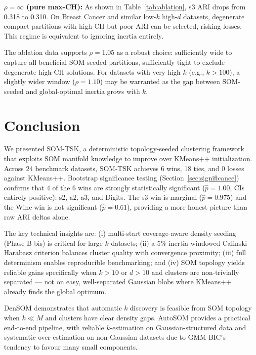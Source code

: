\documentclass[journal]{IEEEtran}
\begin{document}
\textbf{$\rho = \infty$ (pure max-CH):} As shown in Table~\ref{tab:ablation}, s3 ARI drops from 0.318 to 0.310. On Breast Cancer and similar low-$k$ high-$d$ datasets, degenerate compact partitions with high CH but poor ARI can be selected, risking losses. This regime is equivalent to ignoring inertia entirely.

The ablation data supports $\rho = 1.05$ as a robust choice: sufficiently wide to capture all beneficial SOM-seeded partitions, sufficiently tight to exclude degenerate high-CH solutions. For datasets with very high $k$ (e.g., $k > 100$), a slightly wider window ($\rho = 1.10$) may be warranted as the gap between SOM-seeded and global-optimal inertia grows with $k$.

\section{Conclusion}
\label{sec:conclusion}

We presented SOM-TSK, a deterministic topology-seeded clustering framework that exploits SOM manifold knowledge to improve over KMeans++ initialization. Across 24 benchmark datasets, SOM-TSK achieves 6 wins, 18 ties, and 0 losses against KMeans++. Bootstrap significance testing (Section~\ref{sec:significance}) confirms that 4 of the 6 wins are strongly statistically significant ($\hat{p}=1.00$, CIs entirely positive): s2, a2, a3, and Digits. The s3 win is marginal ($\hat{p}=0.975$) and the Wine win is not significant ($\hat{p}=0.61$), providing a more honest picture than raw ARI deltas alone.

The key technical insights are: (i) multi-start coverage-aware density seeding (Phase B-bis) is critical for large-$k$ datasets; (ii) a 5\% inertia-windowed Calinski--Harabasz criterion balances cluster quality with convergence proximity; (iii) full determinism enables reproducible benchmarking; and (iv) SOM topology yields reliable gains specifically when $k > 10$ or $d > 10$ and clusters are non-trivially separated — not on easy, well-separated Gaussian blobs where KMeans++ already finds the global optimum.

DenSOM demonstrates that automatic $k$ discovery is feasible from SOM topology when $k \ll M$ and clusters have clear density gaps. AutoSOM provides a practical end-to-end pipeline, with reliable $k$-estimation on Gaussian-structured data and systematic over-estimation on non-Gaussian datasets due to GMM-BIC's tendency to favour many small components.
\end{document}
